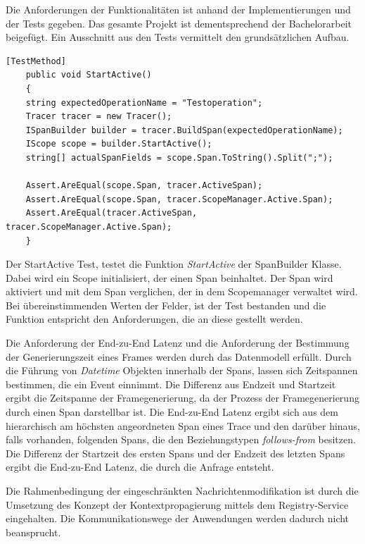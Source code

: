 Die Anforderungen der Funktionalitäten ist anhand der Implementierungen und der Tests gegeben. Das gesamte Projekt ist dementsprechend der Bachelorarbeit beigefügt. Ein Ausschnitt aus den Tests vermittelt den grundsätzlichen Aufbau.

\begin{minipage}[]{\textwidth}
	\begin{lstlisting}[frame=trBL]
	[TestMethod]
	public void StartActive()
	{
	string expectedOperationName = "Testoperation";
	Tracer tracer = new Tracer();
	ISpanBuilder builder = tracer.BuildSpan(expectedOperationName);
	IScope scope = builder.StartActive();
	string[] actualSpanFields = scope.Span.ToString().Split(";");
	
	Assert.AreEqual(scope.Span, tracer.ActiveSpan);
	Assert.AreEqual(scope.Span, tracer.ScopeManager.Active.Span);
	Assert.AreEqual(tracer.ActiveSpan, tracer.ScopeManager.Active.Span);
	}
	\end{lstlisting}
	\label{listing:Unit-Test der Spanbuilder Klasse}
\end{minipage}

Der StartActive Test, testet die Funktion \emph{StartActive} der SpanBuilder Klasse. Dabei wird ein Scope initialisiert, der einen Span beinhaltet. Der Span wird aktiviert und mit dem Span verglichen, der in dem Scopemanager verwaltet wird. Bei übereinstimmenden Werten der Felder, ist der Test bestanden und die Funktion entspricht den Anforderungen, die an diese gestellt werden.

Die Anforderung der End-zu-End Latenz und die Anforderung der Bestimmung der Generierungszeit eines Frames werden durch das Datenmodell erfüllt. Durch die Führung von \emph{Datetime} Objekten innerhalb der Spans, lassen sich Zeitspannen bestimmen, die ein Event einnimmt. Die Differenz aus Endzeit und Startzeit ergibt die Zeitspanne der Framegenerierung, da der Prozess der Framegenerierung durch einen Span darstellbar ist. Die End-zu-End Latenz ergibt sich aus dem hierarchisch am höchsten angeordneten Span eines Trace und den darüber hinaus, falls vorhanden, folgenden Spans, die den Beziehungstypen \emph{follows-from} besitzen. Die Differenz der Startzeit des ersten Spans und der Endzeit des letzten Spans ergibt die End-zu-End Latenz, die durch die Anfrage entsteht.

Die Rahmenbedingung der eingeschränkten Nachrichtenmodifikation ist durch die Umsetzung des Konzept der Kontextpropagierung mittels dem Registry-Service eingehalten. Die Kommunikationswege der Anwendungen werden dadurch nicht beansprucht.


